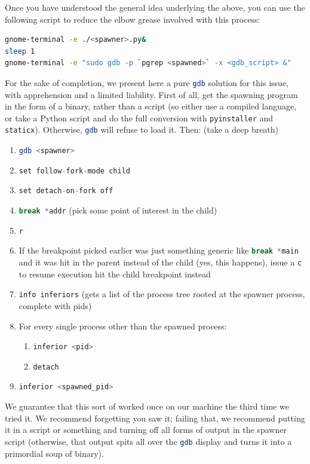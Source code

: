 \documentclass{article}
\newcommand{\xcode}[2]{\colorbox{ubuntuback}{\lstinline[language=#1]|#2|}}
\newcommand{\gdb}[1]{\xcode{C}{#1}}
\begin{document}
Once you have understood the general idea underlying the above, you can use the following script to reduce the elbow grease involved with this process:

\begin{lstlisting}[language=bash]
gnome-terminal -e ./<spawner>.py&
sleep 1
gnome-terminal -e "sudo gdb -p `pgrep <spawned>` -x <gdb_script> &"
\end{lstlisting}

For the sake of completion, we present here a pure \xcode{bash}{gdb} solution for this issue, with apprehension and a limited liability. First of all, get the spawning program in the form of a binary, rather than a script (so either use a compiled language, or take a Python script and do the full conversion with \xcode{bash}{pyinstaller} and \xcode{bash}{staticx}). Otherwise, \xcode{bash}{gdb} will refuse to load it. Then: (take a deep breath)

\begin{enumerate}
    \item \xcode{bash}{gdb <spawner>}
    \item \gdb{set follow-fork-mode child}
    \item \gdb{set detach-on-fork off}
    \item \gdb{break *addr} (pick some point of interest in the child)
    \item \gdb{r}
    \item If the breakpoint picked earlier was just something generic like \gdb{break *main} and it was hit in the parent instead of the child (yes, this happens), issue a \gdb{c} to resume execution hit the child breakpoint instead
    \item \gdb{info inferiors} (gets a list of the process tree rooted at the spawner process, complete with pids)
    \item For every single process other than the spawned process:
        \begin{enumerate}
            \item \gdb{inferior <pid>}
            \item \gdb{detach}
        \end{enumerate}
    \item \gdb{inferior <spawned_pid>}
\end{enumerate}

We guarantee that this sort of worked once on our machine the third time we tried it. We recommend forgetting you saw it; failing that, we recommend putting it in a script or something and turning off all forms of output in the spawner script (otherwise, that output spits all over the \xcode{bash}{gdb} display and turns it into a primordial soup of binary).
\end{document}
